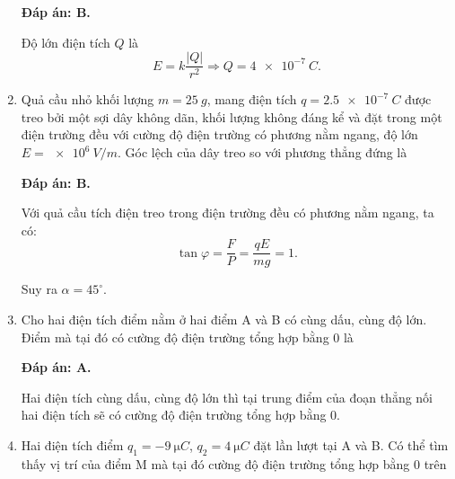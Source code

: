 \begin{enumerate}[label=\bfseries Câu \arabic*:]
{	}
	\loigiai
	{	\textbf{Đáp án: B.}
		
		Độ lớn điện tích $Q$ là
		$$E=k \dfrac{|Q|}{r^2} \Rightarrow Q = \SI{4e-7}{C}.$$
	}
	\item {}
	
	\cauhoi
	{Quả cầu nhỏ khối lượng $m=\SI{25}{g}$, mang điện tích $q=\SI{2.5e-7}{C}$ được treo bởi một sợi dây không dãn, khối lượng không đáng kể và đặt trong một điện trường đều với cường độ điện trường có phương nằm ngang, độ lớn $E=\SI{e6}{V/m}$. Góc lệch của dây treo so với phương thẳng đứng là
		
	}
	\loigiai
	{	\textbf{Đáp án: B.}
		
		Với quả cầu tích điện treo trong điện trường đều có phương nằm ngang, ta có:
		$$\tan \varphi = \dfrac{F}{P} = \dfrac{qE}{mg} = 1.$$
		
		Suy ra $\alpha = 45^\circ$.
	}
	\item {}
	
	\cauhoi
	{Cho hai điện tích điểm nằm ở hai điểm A và B có cùng dấu, cùng độ lớn. Điểm mà tại đó có cường độ điện trường tổng hợp bằng 0 là
		
	}
	\loigiai
	{	\textbf{Đáp án: A.}
		
		Hai điện tích cùng dấu, cùng độ lớn thì tại trung điểm của đoạn thẳng nối hai điện tích sẽ có cường độ điện trường tổng hợp bằng 0.
	}
	\item {}
	
	\cauhoi
	{Hai điện tích điểm $q_1=\SI{-9}{\micro C}$, $q_2=\SI{4}{\micro C}$ đặt lần lượt tại A và B. Có thể tìm thấy vị trí của điểm M mà tại đó cường độ điện trường tổng hợp bằng 0 trên
		
}
\end{enumerate}
